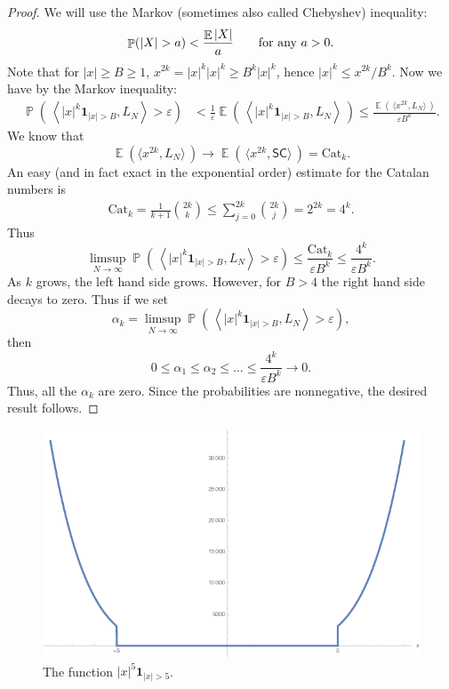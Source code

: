 \documentclass[letterpaper,11pt,oneside,reqno]{amsart}
\numberwithin{equation}{section}
\newcommand{\SC}{\mathsf{SC}}
\DeclareMathOperator{\EE}{\mathbb{E}}
\DeclareMathOperator{\PP}{\mathbb{P}}
\theoremstyle{definition}
\begin{document}
\begin{proof}
	We will use the Markov (sometimes also called Chebyshev) inequality:
	\begin{equation*}
	\PP (  | X | > a ) < \frac{ \EE | X |  }{ a }\qquad \textnormal{for any $a>0$}.
	\end{equation*}
	Note that for $ | x | \ge B \ge 1 $,
	$x^{2k}=|x|^{k}|x|^{k}\ge B^{k}|x|^{k}$, hence
	$ | x |^k \le x^{ 2 k } / B^k $.  Now we have by the Markov inequality:
	\begin{align*}
	\PP \left( \, \left \langle | x |^k \mathbf{1}_{ | x | > B } , L_N \right \rangle > \varepsilon \right) &< \frac{ 1 }{ \varepsilon } \EE \left( \, \left \langle | x |^k \mathbf{1}_{ | x | > B } , L_N \right \rangle \, \right) \le \frac{ \EE \left( \, \langle x^{ 2k } , L_N \rangle \, \right) }{ \varepsilon B^k }.
	\end{align*}
	We know that
	\begin{equation*}
	\EE \left( \langle x^{2k} , L_N \rangle \, \right) \to \EE \left( \, \langle x^{ 2k } , \SC \rangle \, \right) = \mathrm{Cat}_k.
	\end{equation*}
	An easy (and in fact exact in the exponential order) 
	estimate for the Catalan numbers is
	\begin{align*}
	\mathrm{Cat}_k=\frac{1}{k+1}\binom{2k}{k} \le \sum_{ j = 0 }^{ 2k } \binom{2k}{j} = 2^{2k} = 4^k.
	\end{align*}
	Thus
	\begin{equation*}
	\limsup_{ N \to \infty } \PP \left( \, \left \langle | x |^k \mathbf{1}_{ | x | > B } , L_N \right \rangle > \varepsilon \right) \le \frac{ \mathrm{Cat}_k }{ \varepsilon B^k } \le \frac{ 4^k }{ \varepsilon B^k }.
	\end{equation*}
	As $ k $ grows, the left hand side grows. However, for $ B > 4 $ the right hand side decays to zero. Thus if we set
	\begin{equation*}
	\alpha_k = \limsup_{ N \to \infty } \PP \left( \, \left \langle | x |^k \mathbf{1}_{ | x | > B } , L_N \right \rangle > \varepsilon \right),
	\end{equation*}
	then
	$$
	0 \le \alpha_1 \le \alpha_2 \le \ldots \le \frac{ 4^k }{ \varepsilon B^k } \to 0.
	$$
	Thus, all the $ \alpha_k $ are zero. Since the probabilities are nonnegative, the desired result follows.
\end{proof}
\begin{figure}[htbp]
	\includegraphics[width=.6\textwidth]{img/indicator_polynomial.png}
	\caption{The function $|x|^{5}\mathbf{1}_{|x|>5}$.}
	\label{fig:indicator_polynomial}
\end{figure}
\end{document}
